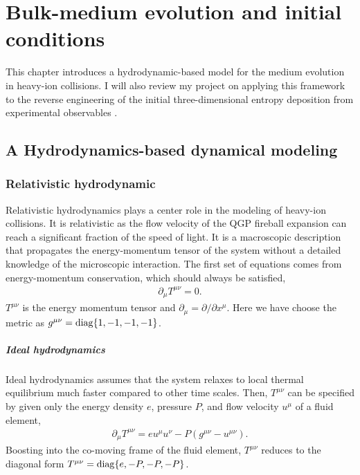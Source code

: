 \chapter{Bulk-medium evolution and initial conditions}
\label{chapter:simulation}
This chapter introduces a hydrodynamic-based model for the medium evolution in heavy-ion collisions.
I will also review my project on applying this framework to the reverse engineering of the initial three-dimensional entropy deposition from experimental observables \cite{PhysRevC.96.044912}.

\section{A Hydrodynamics-based dynamical modeling}
\subsection{Relativistic hydrodynamic}
Relativistic hydrodynamics plays a center role in the modeling of heavy-ion collisions.
It is relativistic as the flow velocity of the QGP fireball expansion can reach a significant fraction of the speed of light.
It is a macroscopic description that propagates the energy-momentum tensor of the system without a detailed knowledge of the microscopic interaction.
The first set of equations comes from energy-momentum conservation, which should always be satisfied,
\begin{eqnarray}\label{eq:hydro:0-4}
\partial_\mu T^{\mu\nu} = 0.
\end{eqnarray}
$T^{\mu\nu}$ is the energy momentum tensor and $\partial_\mu = \partial/\partial x^\mu$. 
Here we have choose the metric as $g^{\mu\nu} = \operatorname{diag}\{1, -1, -1, -1\}$.

\paragraph{Ideal hydrodynamics} Ideal hydrodynamics assumes that the system relaxes to local thermal equilibrium much faster compared to other time scales. Then, $T^{\mu\nu}$ can be specified by given only the energy density $e$, pressure $P$, and flow velocity $u^\mu$ of a fluid element,
\begin{eqnarray}
\partial_\mu T^{\mu\nu} = e u^\mu u^\nu - P (g^{\mu\nu}-u^{\mu\nu}).
\end{eqnarray}
Boosting into the co-moving frame of the fluid element, $T^{\mu\nu}$ reduces to the diagonal form $T^{\mu\nu} = \operatorname{diag}\{e, -P, -P, -P\}$.

